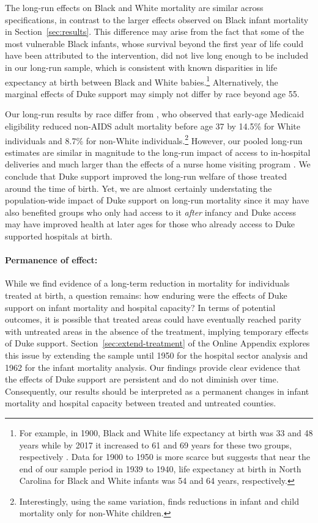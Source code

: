 \documentclass[12pt]{article}
\begin{document}
The long-run effects on Black and White mortality are similar across specifications, in contrast to the larger effects observed on Black infant mortality in Section~\ref{sec:results}. 
This difference may arise from the fact that some of the most vulnerable Black infants, whose survival beyond the first year of life could have been attributed to the intervention, did not live long enough to be included in our long-run sample, which is consistent with known disparities in life expectancy at birth between Black and White babies.\footnote{
For example, in 1900, Black and White life expectancy at birth was 33 and 48 years while by 2017 it increased to 61 and 69 years for these two groups, respectively .
Data for 1900 to 1950 is more scarce but  suggests that near the end of our sample period in 1939 to 1940, life expectancy at birth in North Carolina for Black and White infants was 54 and 64 years, respectively.
}
Alternatively, the marginal effects of Duke support may simply not differ by race beyond age 55.


Our long-run results by race differ from , who observed that early-age Medicaid eligibility reduced non-AIDS adult mortality before age 37 by 14.5\% for White individuals and 8.7\% for non-White individuals.\footnote{Interestingly, using the same variation,  finds reductions in infant and child mortality only for non-White children.} However, our pooled long-run estimates are similar in magnitude to the long-run impact of access to in-hospital deliveries  and much larger than the effects of a nurse home visiting program . 
We conclude that Duke support improved the long-run welfare of those treated around the time of birth. Yet, we are almost certainly understating the population-wide impact of Duke support on long-run mortality since it may have also benefited groups who only had access to it \emph{after} infancy and Duke access may have improved health at later ages for those who already access to Duke supported hospitals at birth. 

\paragraph{Permanence of effect:} 
While we find evidence of a long-term reduction in mortality for individuals treated at birth, a question remains: how enduring were the effects of Duke support on infant mortality and hospital capacity? In terms of potential outcomes, it is possible that treated areas could have eventually reached parity with untreated areas in the absence of the treatment, implying temporary effects of Duke support. 
Section~\ref{sec:extend-treatment} of the Online Appendix explores this issue by extending the sample until 1950 for the hospital sector analysis and 1962 for the infant mortality analysis. Our findings provide clear evidence that the effects of Duke support are persistent and do not diminish over time. Consequently, our results should be interpreted as a permanent changes in infant mortality and hospital capacity between treated and untreated counties.
\end{document}
